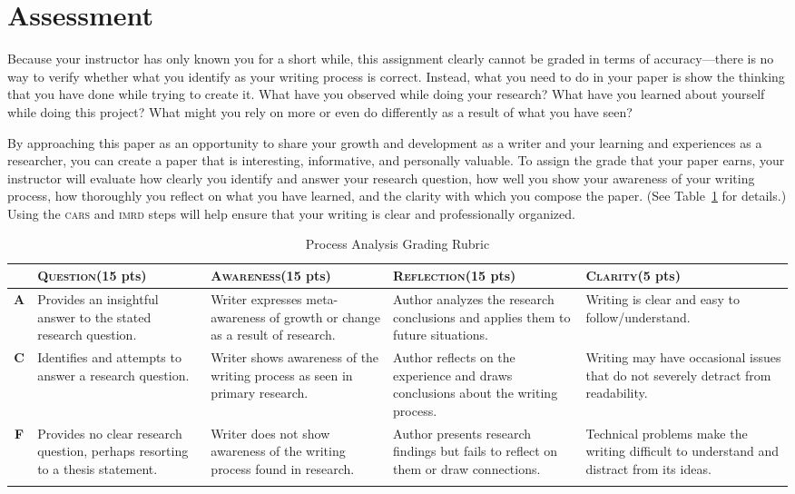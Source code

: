\documentclass[10pt, oneside]{amsart}	%
\begin{document}
\section{Assessment} %
\label{sec:assessment}
Because your instructor has only known you for a short while, this assignment clearly cannot be graded in terms of accuracy—there is no way to verify whether what you identify as your writing process is correct. Instead, what you need to do in your paper is show the thinking that you have done while trying to create it. What have you observed while doing your research? What have you learned about yourself while doing this project? What might you rely on more or even do differently as a result of what you have seen?

By approaching this paper as an opportunity to share your growth and development as a writer and your learning and experiences as a researcher, you can create a paper that is interesting, informative, and personally valuable. To assign the grade that your paper earns, your instructor will evaluate how clearly you identify and answer your research question, how well you show your awareness of your writing process, how thoroughly you reflect on what you have learned, and the clarity with which you compose the paper. (See Table~\ref{tab:rubric} for details.) Using the \textsc{cars} and \textsc{imrd} steps will help ensure that your writing is clear and professionally organized.

\begin{table}[b]
	\tablehead{}
\begin{tabular}{>{\bfseries}cp{1.25in}p{1.25in}p{1.25in}p{1.25in}}
\toprule & \textbf{\textsc{Question}}\newline (15 pts) & \textbf{\textsc{Awareness}}\newline (15 pts) & \textbf{\textsc{Reflection}}\newline (15 pts) & \textbf{\textsc{Clarity}}\newline (5 pts)\\
	\midrule
A &
Provides an insightful answer to the stated research question. &
Writer expresses meta-awareness of growth or change as a result of research. &
Author analyzes the research conclusions and applies them to future situations. &
Writing is clear and easy to follow/understand.
\\
\midrule
C &
Identifies and attempts to answer a research question. &
Writer shows awareness of the writing process as seen in primary research. &
Author reflects on the experience and draws conclusions about the writing process. &
Writing may have occasional issues that do not severely detract from readability.
\\
\midrule
F &
Provides no clear research question, perhaps resorting to a thesis statement. &
Writer does not show awareness of the writing process found in research. &
Author presents research findings but fails to reflect on them or draw connections. &
Technical problems make the writing difficult to understand and distract from its ideas.
\\
	\bottomrule\\
\end{tabular}
\caption{Process Analysis Grading Rubric}\label{tab:rubric}
\end{table}
\end{document}
